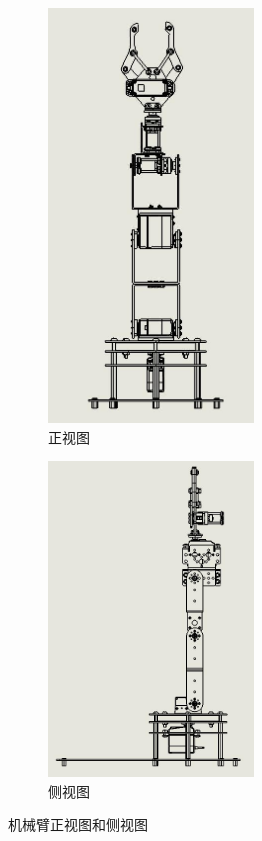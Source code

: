 \documentclass[10pt]{ctexart}
\begin{document}
\vfill
\begin{figure}[H]
    \centering
    \begin{subfigure}{0.45\textwidth}
        \centering
        \includegraphics[width = 0.6\textwidth]{machinery/arm_front.jpg}
        \caption{正视图}
    \end{subfigure}
    \begin{subfigure}{0.45\textwidth}
        \centering
        \includegraphics[width = 0.6\textwidth]{machinery/arm_left.jpg}
        \caption{侧视图}
    \end{subfigure}
    \caption{机械臂正视图和侧视图}
\end{figure}
\end{document}
